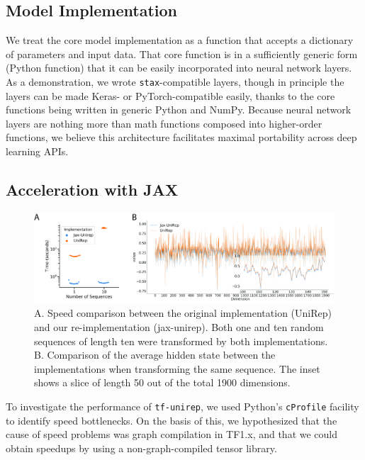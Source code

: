 \documentclass[twoside,11pt]{article}
\begin{document}
\subsection{Model Implementation}

We treat the core model implementation as a function
that accepts a dictionary of parameters and input data.
That core function is in a sufficiently generic form (Python function)
that it can be easily incorporated into neural network layers.
As a demonstration, we wrote \verb|stax|-compatible layers,
though in principle the layers can be made Keras- or PyTorch-compatible easily,
thanks to the core functions being written in generic Python and NumPy.
Because neural network layers are nothing more than math functions
composed into higher-order functions,
we believe this architecture facilitates maximal portability
across deep learning APIs.

\subsection{Acceleration with JAX}

\begin{figure}[!tpb]
    \centerline{\includegraphics[width=6in]{fig01.jpg}}
    \caption{
        A. Speed comparison between the original implementation (UniRep)
        and our re-implementation (jax-unirep).
        Both one and ten random sequences of length ten
        were transformed by both implementations.
        B. Comparison of the average hidden state between the implementations
        when transforming the same sequence.
        The inset shows a slice of length 50 out of the total 1900 dimensions.
    }
    \label{fig:01}
\end{figure}

To investigate the performance of \verb|tf-unirep|,
we used Python's \verb|cProfile| facility to identify speed bottlenecks.
On the basis of this, we hypothesized that the cause of speed problems
was graph compilation in TF1.x,
and that we could obtain speedups by using
a non-graph-compiled tensor library.
\end{document}
